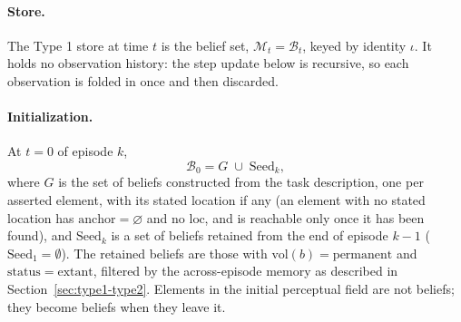 \documentclass[11pt]{article}
\newcommand{\calM}{\mathcal{M}}
\newcommand{\calB}{\mathcal{B}}
\newcommand{\loc}{\mathrm{loc}}
\newcommand{\vol}{\mathrm{vol}}
\newcommand{\stat}{\mathrm{status}}
\newcommand{\anchor}{\mathrm{anchor}}
\begin{document}
\paragraph{Store.}
The Type 1 store at time $t$ is the belief set, $\calM_t=\calB_t$, keyed by identity $\iota$. It holds no observation history: the step update below is recursive, so each observation is folded in once and then discarded. 

\paragraph{Initialization.}
At $t=0$ of episode $k$,
\begin{equation}
\calB_0=G\;\cup\;\mathrm{Seed}_k,
\label{eq:init}
\end{equation}
where $G$ is the set of beliefs constructed from the task description, one per asserted element, with its stated location if any (an element with no stated location has $\anchor=\varnothing$ and no $\loc$, and is reachable only once it has been found), and $\mathrm{Seed}_k$ is a set of beliefs retained from the end of episode $k-1$ ($\mathrm{Seed}_1=\emptyset$). The retained beliefs are those with $\vol(b)=\mathrm{permanent}$ and $\stat=\mathrm{extant}$, filtered by the across-episode memory as described in Section~\ref{sec:type1-type2}. Elements in the initial perceptual field are not beliefs; they become beliefs when they leave it.
\end{document}

